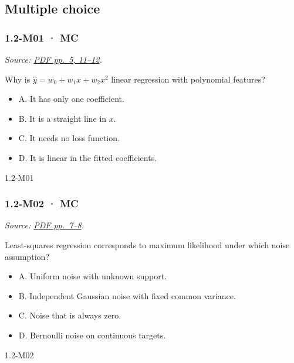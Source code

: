 \subsection{Multiple choice}\label{multiple-choice-1}

\noindent\begin{minipage}{\linewidth}

\subsubsection{1.2-M01 · MC}\label{m01-mc-1}

\emph{Source:
\href{../Lecture\%20Slides/1.2.\%20Shallow\%20Learning.pdf\#page=5}{PDF
pp.~5, 11--12}.}

Why is \(\hat y=w_0+w_1x+w_2x^2\) linear regression with polynomial
features?

\begin{itemize}
\tightlist
\item
  A. It has only one coefficient.
\item
  B. It is a straight line in \(x\).
\item
  C. It needs no loss function.
\item
  D. It is linear in the fitted coefficients.
\end{itemize}

\begin{solution}[8mm]{1.2-M01}

\end{solution}
\end{minipage}\par\medskip

\noindent\begin{minipage}{\linewidth}

\subsubsection{1.2-M02 · MC}\label{m02-mc-1}

\emph{Source:
\href{../Lecture\%20Slides/1.2.\%20Shallow\%20Learning.pdf\#page=7}{PDF
pp.~7--8}.}

Least-squares regression corresponds to maximum likelihood under which
noise assumption?

\begin{itemize}
\tightlist
\item
  A. Uniform noise with unknown support.
\item
  B. Independent Gaussian noise with fixed common variance.
\item
  C. Noise that is always zero.
\item
  D. Bernoulli noise on continuous targets.
\end{itemize}

\begin{solution}[8mm]{1.2-M02}

\end{solution}
\end{minipage}\par\medskip

